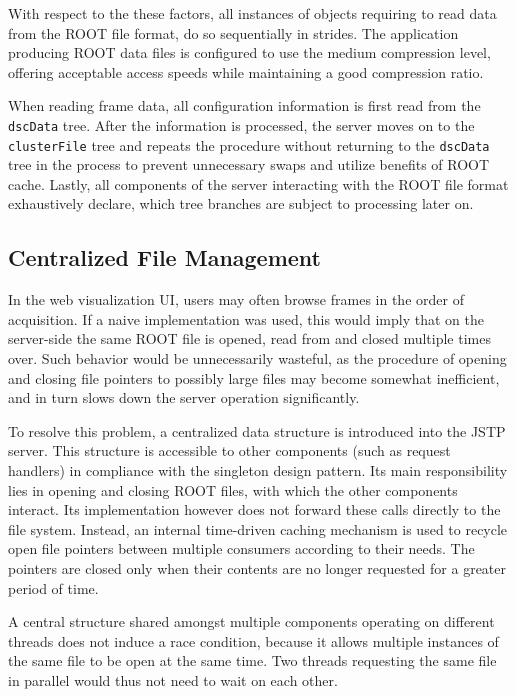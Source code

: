 With respect to the these factors, all instances of objects requiring to read data from the ROOT file format, do so sequentially in strides. The application producing ROOT data files is configured to use the medium compression level, offering acceptable access speeds while maintaining a good compression ratio.

When reading frame data, all configuration information is first read from the \texttt{dscData} tree. After the information is processed, the server moves on to the \texttt{clusterFile} tree and repeats the procedure without returning to the \texttt{dscData} tree in the process to prevent unnecessary swaps and utilize benefits of ROOT cache. Lastly, all components of the server interacting with the ROOT file format exhaustively declare, which tree branches are subject to processing later on.

\subsection{Centralized File Management}
In the web visualization UI, users may often browse frames in the order of acquisition. If a naive implementation was used, this would imply that on the server-side the same ROOT file is opened, read from and closed multiple times over. Such behavior would be unnecessarily wasteful, as the procedure of opening and closing file pointers to possibly large files may become somewhat inefficient, and in turn slows down the server operation significantly.

To resolve this problem, a centralized data structure is introduced into the JSTP server. This structure is accessible to other components (such as request handlers) in compliance with the singleton design pattern. Its main responsibility lies in opening and closing ROOT files, with which the other components interact. Its implementation however does not forward these calls directly to the file system. Instead, an internal time-driven caching mechanism is used to recycle open file pointers between multiple consumers according to their needs. The pointers are closed only when their contents are no longer requested for a greater period of time.

A central structure shared amongst multiple components operating on different threads does not induce a race condition, because it allows multiple instances of the same file to be open at the same time. Two threads requesting the same file in parallel would thus not need to wait on each other.

